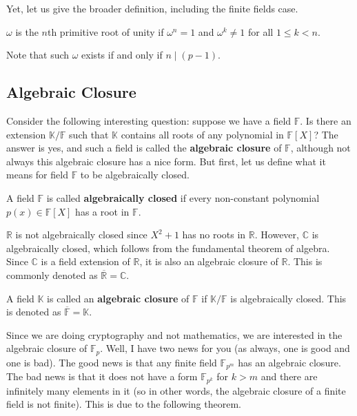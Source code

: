 \documentclass[../lecture-notes.tex]{subfiles}
\begin{document}
Yet, let us give the broader definition, including the finite fields case.

\begin{definition}
    $\omega$ is the $n$th primitive root of unity if $\omega^n=1$ and $\omega^k \neq 1$ for all $1 \leq k < n$.
\end{definition}

Note that such $\omega$ exists if and only if $n \mid (p-1)$. 

\subsection{Algebraic Closure}

Consider the following interesting question: suppose we have a field $\mathbb{F}$. Is there an extension $\mathbb{K}/\mathbb{F}$ such that $\mathbb{K}$ contains all roots of any polynomial in $\mathbb{F}[X]$? The answer is yes, and such a field is called the \textbf{algebraic closure} of $\mathbb{F}$, although not always this algebraic closure has a nice form. But first, let us define what it means for field $\mathbb{F}$ to be algebraically closed.

\begin{definition}
    A field $\mathbb{F}$ is called \textbf{algebraically closed} if every non-constant polynomial $p(x) \in \mathbb{F}[X]$ has a root in $\mathbb{F}$.
\end{definition}

\begin{example}
    $\mathbb{R}$ is not algebraically closed since $X^2+1$ has no roots in $\mathbb{R}$. However, $\mathbb{C}$ is algebraically closed, which follows from the fundamental theorem of algebra. Since $\mathbb{C}$ is a field extension of $\mathbb{R}$, it is also an algebraic closure of $\mathbb{R}$. This is commonly denoted as $\overline{\mathbb{R}} = \mathbb{C}$.
\end{example}

\begin{definition}
    A field $\mathbb{K}$ is called an \textbf{algebraic closure} of $\mathbb{F}$ if $\mathbb{K}/\mathbb{F}$ is algebraically closed. This is denoted as $\overline{\mathbb{F}} = \mathbb{K}$.
\end{definition}

Since we are doing cryptography and not mathematics, we are interested in the algebraic closure of $\mathbb{F}_p$. Well, I have two news for you (as always, one is good and one is bad). The good news is that any finite field $\mathbb{F}_{p^m}$ has an algebraic closure. The bad news is that it does not have a form $\mathbb{F}_{p^k}$ for $k>m$ and there are infinitely many elements in it (so in other words, the algebraic closure of a finite field is not finite). This is due to the following theorem.
\end{document}
